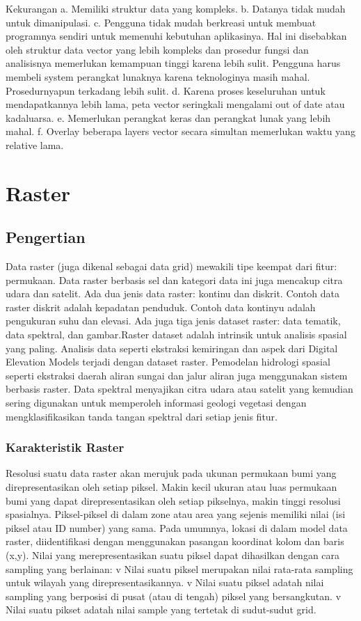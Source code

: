  Kekurangan
 a. Memiliki struktur data yang kompleks.
 b. Datanya tidak mudah untuk dimanipulasi.
 c. Pengguna tidak mudah berkreasi untuk membuat programnya sendiri untuk memenuhi kebutuhan aplikasinya. 
    Hal ini disebabkan oleh struktur data vector yang lebih kompleks dan prosedur fungsi dan analisisnya 
    memerlukan kemampuan tinggi karena lebih sulit. 
    Pengguna harus membeli system perangkat lunaknya karena teknologinya masih mahal. Prosedurnyapun terkadang lebih sulit.
 d. Karena proses keseluruhan untuk mendapatkannya lebih lama, peta vector seringkali mengalami out of date atau kadaluarsa.
 e. Memerlukan perangkat keras dan perangkat lunak yang lebih mahal.
 f. Overlay beberapa layers vector secara simultan memerlukan waktu yang relative lama.
 
 \section{Raster}
 \subsection{Pengertian}
Data raster (juga dikenal sebagai data grid) mewakili tipe keempat dari fitur: permukaan. 
Data raster berbasis sel dan kategori data ini juga mencakup citra udara dan satelit. 
Ada dua jenis data raster: kontinu dan diskrit. Contoh data raster diskrit adalah kepadatan penduduk. 
Contoh data kontinyu adalah pengukuran suhu dan elevasi. Ada juga tiga jenis dataset raster: data tematik, 
data spektral, dan gambar.Raster dataset adalah intrinsik untuk analisis spasial yang paling. 
Analisis data seperti ekstraksi kemiringan dan aspek dari Digital Elevation Models terjadi dengan dataset raster.
Pemodelan hidrologi spasial seperti ekstraksi daerah aliran sungai dan jalur aliran juga menggunakan sistem berbasis raster.
Data spektral menyajikan citra udara atau satelit yang kemudian sering digunakan 
untuk memperoleh informasi geologi vegetasi dengan mengklasifikasikan tanda tangan spektral dari setiap jenis fitur.

\subsubsection{Karakteristik Raster}
Resolusi suatu data raster akan merujuk pada ukunan permukaan bumi yang direpresentasikan oleh setiap piksel. 
Makin kecil ukuran atau luas permukaan bumi yang dapat direpresentasikan oleh setiap pikselnya, makin tinggi resolusi spasialnya.
Piksel-piksel di dalam zone atau area yang sejenis memiliki nilai (isi piksel atau ID number) yang sama.
Pada umumnya, lokasi di dalam model data raster, diidentifikasi dengan menggunakan pasangan koordinat kolom dan baris (x,y).
Nilai yang merepresentasikan suatu piksel dapat dihasilkan dengan cara sampling yang berlainan:
v  Nilai suatu piksel merupakan nilai rata-rata sampling untuk wilayah yang direpresentasikannya.
v  Nilai suatu piksel adatah nilai sampling yang berposisi di pusat (atau di tengah) piksel yang bersangkutan.
v  Nilai suatu pikset adatah nilai sample yang tertetak di sudut-sudut grid.

